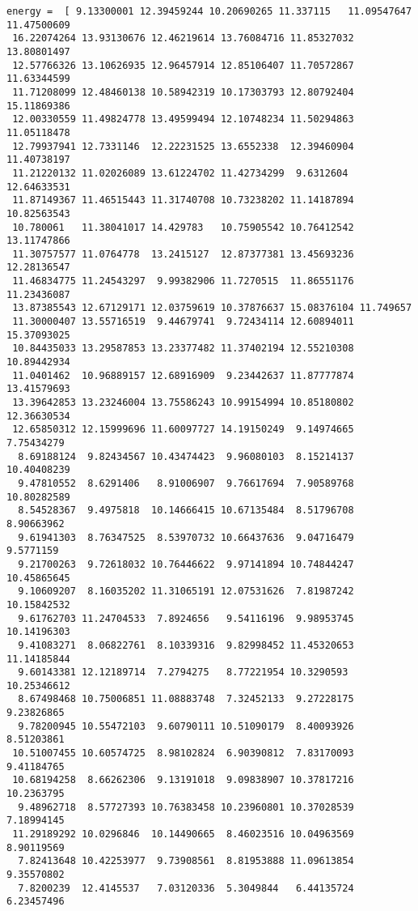 \documentclass[11pt]{article}
\begin{document}
    \begin{Verbatim}[commandchars=\\\{\}]
energy =  [ 9.13300001 12.39459244 10.20690265 11.337115   11.09547647 11.47500609
 16.22074264 13.93130676 12.46219614 13.76084716 11.85327032 13.80801497
 12.57766326 13.10626935 12.96457914 12.85106407 11.70572867 11.63344599
 11.71208099 12.48460138 10.58942319 10.17303793 12.80792404 15.11869386
 12.00330559 11.49824778 13.49599494 12.10748234 11.50294863 11.05118478
 12.79937941 12.7331146  12.22231525 13.6552338  12.39460904 11.40738197
 11.21220132 11.02026089 13.61224702 11.42734299  9.6312604  12.64633531
 11.87149367 11.46515443 11.31740708 10.73238202 11.14187894 10.82563543
 10.780061   11.38041017 14.429783   10.75905542 10.76412542 13.11747866
 11.30757577 11.0764778  13.2415127  12.87377381 13.45693236 12.28136547
 11.46834775 11.24543297  9.99382906 11.7270515  11.86551176 11.23436087
 13.87385543 12.67129171 12.03759619 10.37876637 15.08376104 11.749657
 11.30000407 13.55716519  9.44679741  9.72434114 12.60894011 15.37093025
 10.84435033 13.29587853 13.23377482 11.37402194 12.55210308 10.89442934
 11.0401462  10.96889157 12.68916909  9.23442637 11.87777874 13.41579693
 13.39642853 13.23246004 13.75586243 10.99154994 10.85180802 12.36630534
 12.65850312 12.15999696 11.60097727 14.19150249  9.14974665  7.75434279
  8.69188124  9.82434567 10.43474423  9.96080103  8.15214137 10.40408239
  9.47810552  8.6291406   8.91006907  9.76617694  7.90589768 10.80282589
  8.54528367  9.4975818  10.14666415 10.67135484  8.51796708  8.90663962
  9.61941303  8.76347525  8.53970732 10.66437636  9.04716479  9.5771159
  9.21700263  9.72618032 10.76446622  9.97141894 10.74844247 10.45865645
  9.10609207  8.16035202 11.31065191 12.07531626  7.81987242 10.15842532
  9.61762703 11.24704533  7.8924656   9.54116196  9.98953745 10.14196303
  9.41083271  8.06822761  8.10339316  9.82998452 11.45320653 11.14185844
  9.60143381 12.12189714  7.2794275   8.77221954 10.3290593  10.25346612
  8.67498468 10.75006851 11.08883748  7.32452133  9.27228175  9.23826865
  9.78200945 10.55472103  9.60790111 10.51090179  8.40093926  8.51203861
 10.51007455 10.60574725  8.98102824  6.90390812  7.83170093  9.41184765
 10.68194258  8.66262306  9.13191018  9.09838907 10.37817216 10.2363795
  9.48962718  8.57727393 10.76383458 10.23960801 10.37028539  7.18994145
 11.29189292 10.0296846  10.14490665  8.46023516 10.04963569  8.90119569
  7.82413648 10.42253977  9.73908561  8.81953888 11.09613854  9.35570802
  7.8200239  12.4145537   7.03120336  5.3049844   6.44135724  6.23457496

\end{Verbatim}
\end{document}
